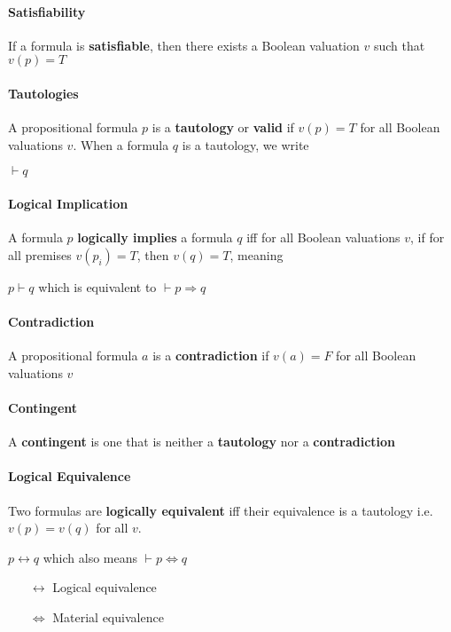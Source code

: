 \documentclass[12pt]{report}
\begin{document}
        \paragraph{Satisfiability} If a formula is \textbf{satisfiable}, then
        there exists a Boolean valuation $v$ such that $v(p) = T$

        \paragraph{Tautologies} A propositional formula $p$ is a
        \textbf{tautology} or \textbf{valid} if $v(p) = T$ for all Boolean
        valuations $v$. When a formula $q$ is a tautology, we write
        \begin{center}
           $\vdash q$
        \end{center}

        \paragraph{Logical Implication} A formula $p$ \textbf{logically
        implies} a formula $q$ iff for all Boolean valuations $v$, if for all
        premises $v(p_i) =
        T$, then $v(q) = T$, meaning
        \begin{center}
          $p \vdash q$ which is equivalent to $\vdash p \Rightarrow q$
        \end{center}

        \paragraph{Contradiction} A propositional formula $a$ is a
        \textbf{contradiction} if $v(a) = F$ for all Boolean valuations $v$

        \paragraph{Contingent} A \textbf{contingent} is one that is neither a
        \textbf{tautology} nor a \textbf{contradiction}

        \paragraph{Logical Equivalence} Two formulas are \textbf{logically
        equivalent} iff their equivalence is a tautology i.e. $v(p) = v(q)$ for
        all $v$.
        \begin{center}
          $p\leftrightarrow q$ which also means $\vdash p \Leftrightarrow q$
        \end{center}
        \begin{itemize}
          \item[$\leftrightarrow$] Logical equivalence
          \item[$\Leftrightarrow$] Material equivalence
        \end{itemize}
\end{document}
